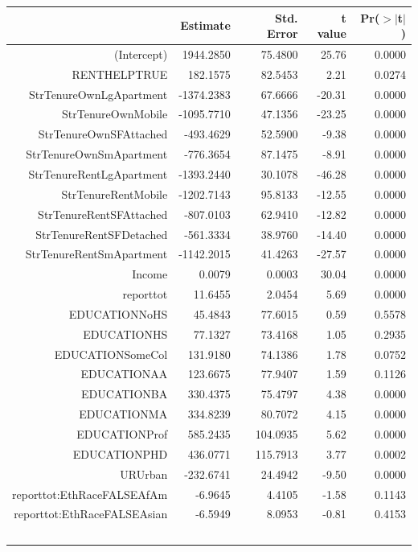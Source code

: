\documentclass{article}
\begin{document}
\begin{longtable}{rrrrr}
  \hline
 & Estimate & Std. Error & t value & Pr($>$$|$t$|$) \\ 
  \hline
(Intercept) & 1944.2850 & 75.4800 & 25.76 & 0.0000 \\ 
  RENTHELPTRUE & 182.1575 & 82.5453 & 2.21 & 0.0274 \\ 
  StrTenureOwnLgApartment & -1374.2383 & 67.6666 & -20.31 & 0.0000 \\ 
  StrTenureOwnMobile & -1095.7710 & 47.1356 & -23.25 & 0.0000 \\ 
  StrTenureOwnSFAttached & -493.4629 & 52.5900 & -9.38 & 0.0000 \\ 
  StrTenureOwnSmApartment & -776.3654 & 87.1475 & -8.91 & 0.0000 \\ 
  StrTenureRentLgApartment & -1393.2440 & 30.1078 & -46.28 & 0.0000 \\ 
  StrTenureRentMobile & -1202.7143 & 95.8133 & -12.55 & 0.0000 \\ 
  StrTenureRentSFAttached & -807.0103 & 62.9410 & -12.82 & 0.0000 \\ 
  StrTenureRentSFDetached & -561.3334 & 38.9760 & -14.40 & 0.0000 \\ 
  StrTenureRentSmApartment & -1142.2015 & 41.4263 & -27.57 & 0.0000 \\ 
  Income & 0.0079 & 0.0003 & 30.04 & 0.0000 \\ 
  reporttot & 11.6455 & 2.0454 & 5.69 & 0.0000 \\ 
  EDUCATIONNoHS & 45.4843 & 77.6015 & 0.59 & 0.5578 \\ 
  EDUCATIONHS & 77.1327 & 73.4168 & 1.05 & 0.2935 \\ 
  EDUCATIONSomeCol & 131.9180 & 74.1386 & 1.78 & 0.0752 \\ 
  EDUCATIONAA & 123.6675 & 77.9407 & 1.59 & 0.1126 \\ 
  EDUCATIONBA & 330.4375 & 75.4797 & 4.38 & 0.0000 \\ 
  EDUCATIONMA & 334.8239 & 80.7072 & 4.15 & 0.0000 \\ 
  EDUCATIONProf & 585.2435 & 104.0935 & 5.62 & 0.0000 \\ 
  EDUCATIONPHD & 436.0771 & 115.7913 & 3.77 & 0.0002 \\ 
  URUrban & -232.6741 & 24.4942 & -9.50 & 0.0000 \\ 
  reporttot:EthRaceFALSEAfAm & -6.9645 & 4.4105 & -1.58 & 0.1143 \\ 
  reporttot:EthRaceFALSEAsian & -6.5949 & 8.0953 & -0.81 & 0.4153 \\ 
$$
\end{longtable}
\end{document}
